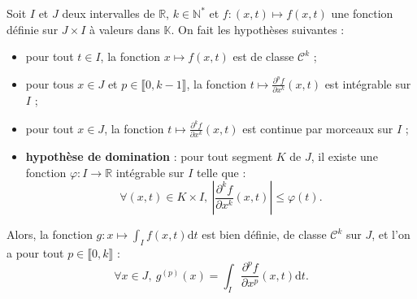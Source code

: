 \documentclass[french]{article}
\newcommand{\N}{\mathbb{N}}
\newcommand{\R}{\mathbb{R}}
\newcommand{\K}{\mathbb{K}}
\newcommand{\st}{^*}
\renewcommand{\d}{\text{d}}
\theoremstyle{plain}
\theoremstyle{definition}
\theoremstyle{remark}
\begin{document}
\begin{cor}
	Soit $I$ et $J$ deux intervalles de $\R$, $k\in\N\st$ et $f:(x,t)\mapsto f(x,t)$ une fonction définie sur $J\times I$ à valeurs dans $\K$. On fait les hypothèses suivantes :
	\begin{itemize}
		\item pour tout $t\in I$, la fonction $x\mapsto f(x,t)$ est de classe $\mathcal{C}^k$ ;
		\item pour tous $x\in J$ et $p\in\llbracket0,k-1\rrbracket$, la fonction $t\mapsto \displaystyle\frac{\partial^p f}{\partial x^k}(x,t)$ est intégrable sur $I$ ;
		\item pour tout $x\in J$, la fonction $t\mapsto\displaystyle\frac{\partial^k f}{\partial x^k}(x,t)$ est continue par morceaux sur $I$ ;
		\item \textbf{hypothèse de domination} : pour tout segment $K$ de $J$, il existe une fonction $\varphi:I\to\R$ intégrable sur $I$ telle que :
		$$\forall (x,t)\in K\times I,\ \left\lvert\frac{\partial^k f}{\partial x^k}(x,t)\right\rvert\leqslant\varphi(t).$$
	\end{itemize}
	Alors, la fonction $g:x\mapsto\displaystyle\int_I f(x,t)\d t$ est bien définie, de classe $\mathcal{C}^k$ sur $J$, et l'on a pour tout $p\in\llbracket0,k\rrbracket$ :
	$$\forall x\in J,\ g^{(p)}(x)=\int_I\frac{\partial^p f}{\partial x^p}(x,t)\d t.$$
\end{cor}
\end{document}
